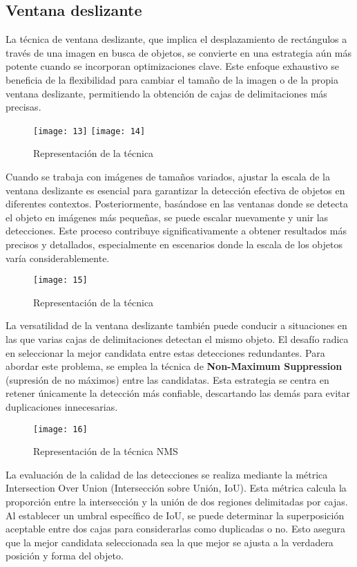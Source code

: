 	\subsection{Ventana deslizante}
	La técnica de ventana deslizante, que implica el desplazamiento de rectángulos a través de una imagen en busca de objetos, se convierte en una estrategia aún más potente cuando se incorporan optimizaciones clave. Este enfoque exhaustivo se beneficia de la flexibilidad para cambiar el tamaño de la imagen o de la propia ventana deslizante, permitiendo la obtención de cajas de delimitaciones más precisas.
	
	\begin{figure}[ht]
  		\centering
  		\texttt{[image: 13]}
  		\hspace{0.5cm}
  		\texttt{[image: 14]}
  		\caption{Representación de la técnica}
	\end{figure}

	Cuando se trabaja con imágenes de tamaños variados, ajustar la escala de la ventana deslizante es esencial para garantizar la detección efectiva de objetos en diferentes contextos. Posteriormente, basándose en las ventanas donde se detecta el objeto en imágenes más pequeñas, se puede escalar nuevamente y unir las detecciones. Este proceso contribuye significativamente a obtener resultados más precisos y detallados, especialmente en escenarios donde la escala de los objetos varía considerablemente.

	\begin{figure}[ht]
	    \centering
		\texttt{[image: 15]}
		\caption{Representación de la técnica}
	\end{figure}

	La versatilidad de la ventana deslizante también puede conducir a situaciones en las que varias cajas de delimitaciones detectan el mismo objeto. El desafío radica en seleccionar la mejor candidata entre estas detecciones redundantes. Para abordar este problema, se emplea la técnica de \textbf{Non-Maximum Suppression} (supresión de no máximos) entre las candidatas. Esta estrategia se centra en retener únicamente la detección más confiable, descartando las demás para evitar duplicaciones innecesarias.
	
	\begin{figure}[ht]
	    \centering
		\texttt{[image: 16]}
		\caption{Representación de la técnica NMS}
	\end{figure}
	
	La evaluación de la calidad de las detecciones se realiza mediante la métrica Intersection Over Union (Intersección sobre Unión, IoU). Esta métrica calcula la proporción entre la intersección y la unión de dos regiones delimitadas por cajas. Al establecer un umbral específico de IoU, se puede determinar la superposición aceptable entre dos cajas para considerarlas como duplicadas o no. Esto asegura que la mejor candidata seleccionada sea la que mejor se ajusta a la verdadera posición y forma del objeto.

